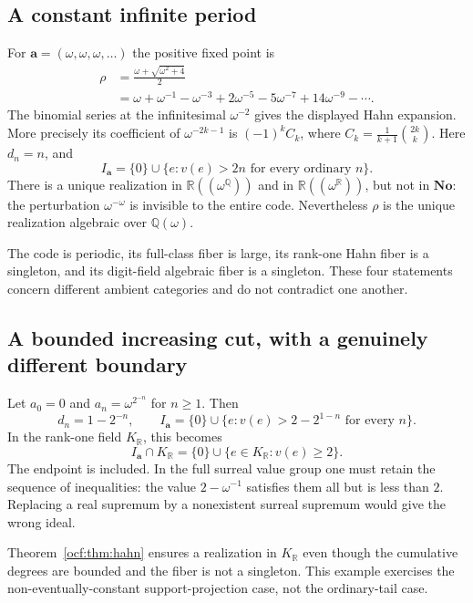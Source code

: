 \documentclass[11pt,a4paper]{article}
\numberwithin{equation}{section}
\theoremstyle{definition}
\theoremstyle{remark}
\newcommand{\No}{\mathbf{No}}
\newcommand{\R}{\mathbb R}
\newcommand{\Q}{\mathbb Q}
\newcommand{\codea}{\boldsymbol a}
\begin{document}
\subsection{A constant infinite period}

For $\codea=(\omega,\omega,\omega,\ldots)$ the positive fixed point is
\begin{equation}\label{ocf:eq:rho}
\begin{split}
 \rho&=\frac{\omega+\sqrt{\omega^2+4}}2\\
 &=\omega+\omega^{-1}-\omega^{-3}+2\omega^{-5}
  -5\omega^{-7}+14\omega^{-9}-\cdots.
\end{split}
\end{equation}
The binomial series at the infinitesimal $\omega^{-2}$ gives the displayed
Hahn expansion. More precisely its coefficient of $\omega^{-2k-1}$ is
$(-1)^kC_k$, where $C_k=\frac1{k+1}\binom{2k}{k}$.
Here $d_n=n$, and
\[
 I_{\codea}=\{0\}\cup\{e:v(e)>2n\text{ for every ordinary }n\}.
\]
There is a unique realization in $\R((\omega^\Q))$ and in
$\R((\omega^\R))$, but not in $\No$: the perturbation
$\omega^{-\omega}$ is invisible to the entire code. Nevertheless $\rho$
is the unique realization algebraic over $\Q(\omega)$.

The code is periodic, its full-class fiber is large, its rank-one Hahn
fiber is a singleton, and its digit-field algebraic fiber is a singleton.
These four statements concern different ambient categories and do not
contradict one another.

\subsection{A bounded increasing cut, with a genuinely different boundary}

Let $a_0=0$ and $a_n=\omega^{2^{-n}}$ for $n\ge1$. Then
\[
 d_n=1-2^{-n},\qquad
 I_{\codea}=\{0\}\cup\{e:v(e)>2-2^{1-n}\text{ for every }n\}.
\]
In the rank-one field $K_\R$, this becomes
\begin{equation}\label{ocf:eq:rankoneboundary}
 I_{\codea}\cap K_\R=\{0\}\cup\{e\in K_\R:v(e)\ge2\}.
\end{equation}
The endpoint is included. In the full surreal value group one must retain
the sequence of inequalities: the value $2-\omega^{-1}$ satisfies them
all but is less than $2$. Replacing a real supremum by a nonexistent
surreal supremum would give the wrong ideal.

Theorem~\ref{ocf:thm:hahn} ensures a realization in $K_\R$ even though the
cumulative degrees are bounded and the fiber is not a singleton.
This example exercises the non-eventually-constant support-projection
case, not the ordinary-tail case.
\end{document}
